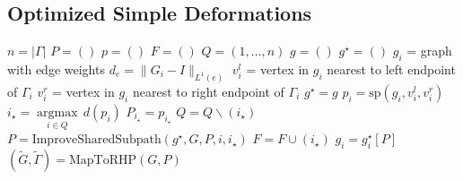 \documentclass[reqno]{amsart}
\DeclareMathOperator*{\argmax}{argmax}
\begin{document}
\subsection{Optimized Simple Deformations}\label{subsec:algoSteepestDescent}
\begin{algorithm}[ht]
	\caption{Optimized Simple Deformation}\label{algo:optPath}
	\begin{algorithmic}[1]
		\State $n = |\Gamma|$ 
		\State $P = ()$ 			
		\State $p = ()$ 			
		\State $F = ()$ 			
		\State $Q = (1,\dots,n)$ 		
		\State $g = ()$          		
		\State $g^\star = ()$    		
		\State $g_i$ = graph with edge weights $d_e = \| G_i - I \|_{L^1(e)}$  \label{line:graphcreation}
		\State $v^l_i$ = vertex in $g_i$ nearest to left endpoint of $\Gamma_i$ \label{line:endpoint}
		\State $v^r_i$ = vertex in $g_i$ nearest to right endpoint of $\Gamma_i$
		\EndFor
		\State $g^\star = g$
				\State $p_i = \text{sp}(g_i,v^l_i,v^r_i)$  \label{line:shortestpaths}
			\EndFor
			\State $i_{\star} = \underset{i \in Q}{\argmax}\,d(p_i)$ \label{line:selectPath}
			\State $P_{i_\star} = p_{i_\star}$
			\State $Q = Q \backslash (i_\star)$
					\State $P = \text{ImproveSharedSubpath}(g^\star,G,P,i,i_\star)$ \label{line:improveCommonSubPath}
				\EndIf
			\EndFor
			\State $F = F \cup (i_\star)$
				\State $g_i = g^\star_i[P]$ \label{line:splitGraphs}
			\EndFor
		\EndWhile
		\State $(\tilde G,\tilde\Gamma) = \text{MapToRHP}(G,P)$  \label{line:mapToRHP}
		\State {}
		\EndProcedure
	\end{algorithmic}
\end{algorithm}
\end{document}
